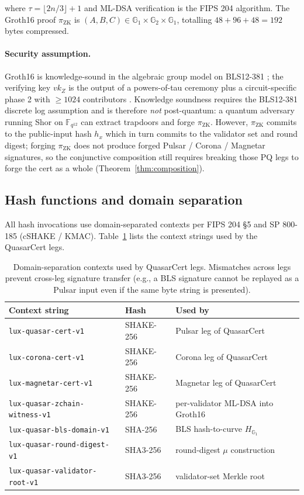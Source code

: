 where $\tau = \lfloor 2n/3 \rfloor + 1$ and ML-DSA verification is
the FIPS 204 algorithm. The Groth16 proof $\pi_{\mathrm{ZK}}$ is
$(A, B, C) \in \mathbb{G}_1 \times \mathbb{G}_2 \times \mathbb{G}_1$,
totalling $48 + 96 + 48 = 192$ bytes compressed.

\paragraph{Security assumption.}
Groth16 is knowledge-sound in the algebraic group model on
BLS12-381 \cite{groth2016}; the verifying key $\mathit{vk}_Z$ is the
output of a powers-of-tau ceremony plus a circuit-specific phase 2
with $\geq 1024$ contributors \cite{bowegabizonmiers}. Knowledge
soundness requires the BLS12-381 discrete log assumption and is
therefore \emph{not} post-quantum: a quantum adversary running Shor
on $\mathbb{F}_{q^{12}}$ can extract trapdoors and forge
$\pi_{\mathrm{ZK}}$. However, $\pi_{\mathrm{ZK}}$ commits to the
public-input hash $h_x$ which in turn commits to the validator set
and round digest; forging $\pi_{\mathrm{ZK}}$ does not produce
forged Pulsar / Corona / Magnetar signatures, so the conjunctive
composition still requires breaking those PQ legs to forge the
cert as a whole (Theorem~\ref{thm:composition}).

\subsection{Hash functions and domain separation}

All hash invocations use domain-separated contexts per FIPS 204 \S5
and SP 800-185 (cSHAKE / KMAC). Table~\ref{tab:domsep} lists the
context strings used by the QuasarCert legs.

\begin{table}[ht]
\centering
\small
\begin{tabular}{@{}lll@{}}
\toprule
\textbf{Context string} & \textbf{Hash} & \textbf{Used by} \\
\midrule
\texttt{lux-quasar-cert-v1} & SHAKE-256 & Pulsar leg of QuasarCert \\
\texttt{lux-corona-cert-v1} & SHAKE-256 & Corona leg of QuasarCert \\
\texttt{lux-magnetar-cert-v1} & SHAKE-256 & Magnetar leg of QuasarCert \\
\texttt{lux-quasar-zchain-witness-v1} & SHAKE-256 & per-validator ML-DSA into Groth16 \\
\texttt{lux-quasar-bls-domain-v1} & SHA-256 & BLS hash-to-curve $H_{\mathbb{G}_1}$ \\
\texttt{lux-quasar-round-digest-v1} & SHA3-256 & round-digest $\mu$ construction \\
\texttt{lux-quasar-validator-root-v1} & SHA3-256 & validator-set Merkle root \\
\bottomrule
\end{tabular}
\caption{Domain-separation contexts used by QuasarCert legs.
Mismatches across legs prevent cross-leg signature transfer (e.g.,
a BLS signature cannot be replayed as a Pulsar input even if the
same byte string is presented).}
\label{tab:domsep}
\end{table}
